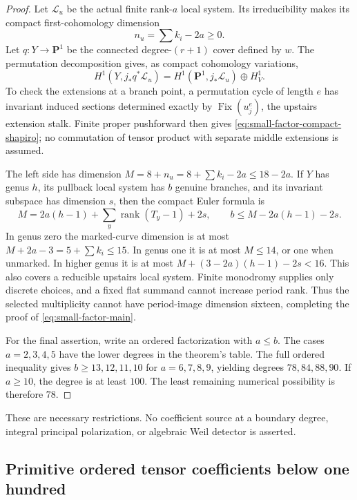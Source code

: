 \documentclass[11pt]{article}
\theoremstyle{definition}
\theoremstyle{remark}
\begin{document}
\begin{proof}
Let $\mathcal L_u$ be the actual finite rank-$a$ local
system.  Its irreducibility makes its compact first-cohomology
dimension
\[
                         n_u=\sum k_i-2a\geq0.
\]
Let $q:Y\longrightarrow\mathbf P^1$ be the connected
degree-$(r+1)$ cover defined by $w$.
The permutation decomposition gives, as compact cohomology
variations,
\begin{equation}\label{eq:small-factor-compact-shapiro}
 H^1(Y,j_*q^*\mathcal L_u)
   =H^1(\mathbf P^1,j_*\mathcal L_u)\oplus H^1_V.
\end{equation}
To check the extensions at a branch point, a permutation
cycle of length $e$ has invariant induced sections determined
exactly by $\operatorname{Fix}(u_j^e)$, the upstairs extension
stalk.  Finite proper pushforward then gives
\eqref{eq:small-factor-compact-shapiro}; no commutation of
tensor product with separate middle extensions is assumed.

The left side has dimension
$M=8+n_u=8+\sum k_i-2a\leq18-2a$.
If $Y$ has genus $h$, its pullback local system has $b$
genuine branches, and its invariant subspace has dimension $s$,
then the compact Euler formula is
\[
 M=2a(h-1)+\sum_y\operatorname{rank}(T_y-1)+2s,
 \qquad b\leq M-2a(h-1)-2s.
\]
In genus zero the marked-curve dimension is at most
$M+2a-3=5+\sum k_i\leq15$.
In genus one it is at most $M\leq14$, or one when unmarked.
In higher genus it is at most
$M+(3-2a)(h-1)-2s<16$.
This also covers a reducible upstairs local system.
Finite monodromy supplies only discrete choices, and a fixed
flat summand cannot increase period rank.
Thus the selected multiplicity cannot have period-image
dimension sixteen, completing the proof of
\eqref{eq:small-factor-main}.

For the final assertion, write an ordered factorization with
$a\leq b$.  The cases $a=2,3,4,5$ have the lower degrees
in the theorem's table.
The full ordered inequality gives $b\geq13,12,11,10$ for
$a=6,7,8,9$, yielding degrees $78,84,88,90$.
If $a\geq10$, the degree is at least $100$.
The least remaining numerical possibility is therefore $78$.
\end{proof}

These are necessary restrictions.  No coefficient source at
a boundary degree, integral principal polarization, or
algebraic Weil detector is asserted.


\subsection{Primitive ordered tensor coefficients below one hundred}
\end{document}
